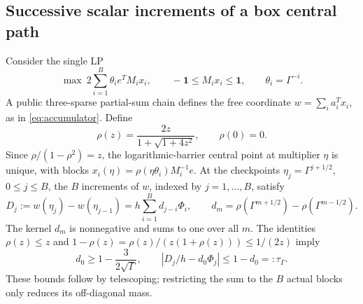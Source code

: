 \subsection{Successive scalar increments of a box central path}
Consider the single LP
\begin{equation}\label{eq:multiplex-lp}
 \max\ 2\sum_{i=1}^B\theta_i e^TM_ix_i,
 \qquad -\mathbf1\leq M_ix_i\leq\mathbf1,
 \qquad \theta_i=\Gamma^{-i}.
\end{equation}
A public three-sparse partial-sum chain defines the free coordinate
$w=\sum_i a_i^Tx_i$, as in \eqref{eq:accumulator}.  Define
\[
 \rho(z)=\frac{2z}{1+\sqrt{1+4z^2}},\qquad \rho(0)=0.
\]
Since $\rho/(1-\rho^2)=z$, the logarithmic-barrier central point at
multiplier $\eta$ is unique, with blocks
$x_i(\eta)=\rho(\eta\theta_i)M_i^{-1}e$.  At the checkpoints
$\eta_j=\Gamma^{j+1/2}$, $0\leq j\leq B$, the $B$ increments of $w$,
indexed by $j=1,\ldots,B$, satisfy
\begin{equation}\label{eq:increment-kernel}
 D_j:=w(\eta_j)-w(\eta_{j-1})
   =h\sum_{i=1}^B d_{j-i}\Phi_i,
 \qquad d_m=\rho(\Gamma^{m+1/2})-\rho(\Gamma^{m-1/2}).
\end{equation}
The kernel $d_m$ is nonnegative and sums to one over all $m$.
The identities
$\rho(z)\leq z$ and
$1-\rho(z)=\rho(z)/(z(1+\rho(z)))\leq1/(2z)$ imply
\begin{equation}\label{eq:increment-leakage}
 d_0\geq1-\frac{3}{2\sqrt\Gamma},\qquad
 \left|D_j/h-d_0\Phi_j\right|\leq1-d_0=:\tau_\Gamma.
\end{equation}
These bounds follow by telescoping; restricting the sum to the $B$ actual
blocks only reduces its off-diagonal mass.

